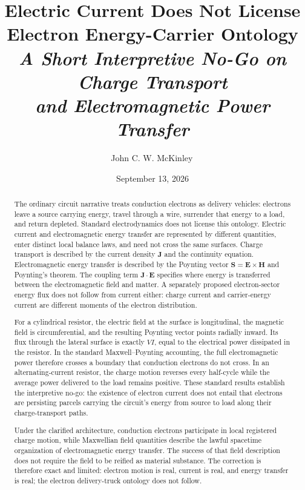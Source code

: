 \documentclass[12pt,onecolumn]{article}
\title{\textbf{Electric Current Does Not License\\
Electron Energy-Carrier Ontology}\\[0.4em]
\large\textit{A Short Interpretive No-Go on Charge Transport\\
and Electromagnetic Power Transfer}}
\author{John C. W. McKinley\,\orcidlink{0009-0005-7097-5035}}
\date{September 13, 2026}
\begin{document}
\maketitle

\begin{abstract}
The ordinary circuit narrative treats conduction electrons as delivery vehicles: electrons leave a source carrying energy, travel through a wire, surrender that energy to a load, and return depleted. Standard electrodynamics does not license this ontology. Electric current and electromagnetic energy transfer are represented by different quantities, enter distinct local balance laws, and need not cross the same surfaces. Charge transport is described by the current density $\mathbf J$ and the continuity equation. Electromagnetic energy transfer is described by the Poynting vector $\mathbf S=\mathbf E\times\mathbf H$ and Poynting's theorem. The coupling term $\mathbf J\cdot\mathbf E$ specifies where energy is transferred between the electromagnetic field and matter. A separately proposed electron-sector energy flux does not follow from current either: charge current and carrier-energy current are different moments of the electron distribution.

For a cylindrical resistor, the electric field at the surface is longitudinal, the magnetic field is circumferential, and the resulting Poynting vector points radially inward. Its flux through the lateral surface is exactly $VI$, equal to the electrical power dissipated in the resistor. In the standard Maxwell--Poynting accounting, the full electromagnetic power therefore crosses a boundary that conduction electrons do not cross. In an alternating-current resistor, the charge motion reverses every half-cycle while the average power delivered to the load remains positive. These standard results establish the interpretive no-go: the existence of electron current does not entail that electrons are persisting parcels carrying the circuit's energy from source to load along their charge-transport paths.

Under the clarified architecture, conduction electrons participate in local registered charge motion, while Maxwellian field quantities describe the lawful spacetime organization of electromagnetic energy transfer. The success of that field description does not require the field to be reified as material substance. The correction is therefore exact and limited: electron motion is real, current is real, and energy transfer is real; the electron delivery-truck ontology does not follow.
\end{abstract}
\end{document}

